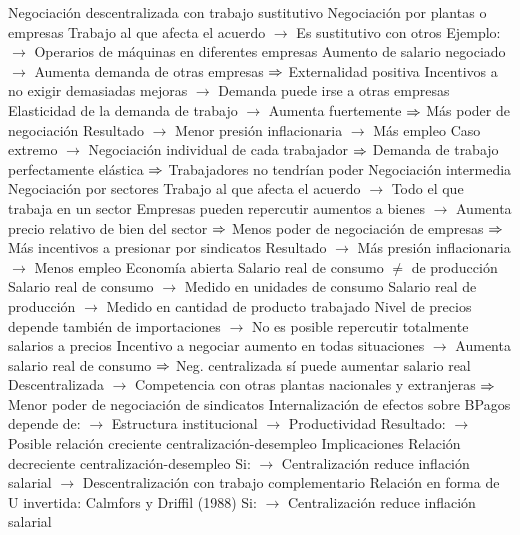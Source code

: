 \documentclass{nuevotema}
\begin{document}
\begin{esquemal}
				\4 Negociación descentralizada con trabajo sustitutivo
				\4[] Negociación por plantas o empresas
				\4[] Trabajo al que afecta el acuerdo
				\4[] $\to$ Es sustitutivo con otros
				\4[] Ejemplo:
				\4[] $\to$ Operarios de máquinas en diferentes empresas
				\4[] Aumento de salario negociado
				\4[] $\to$ Aumenta demanda de otras empresas
				\4[] $\Rightarrow$ Externalidad positiva
				\4[] Incentivos a no exigir demasiadas mejoras
				\4[] $\to$ Demanda puede irse a otras empresas
				\4[] Elasticidad de la demanda de trabajo
				\4[] $\to$ Aumenta fuertemente
				\4[] $\Rightarrow$ Más poder de negociación
				\4[] Resultado
				\4[] $\to$ Menor presión inflacionaria
				\4[] $\to$ Más empleo
				\4[] Caso extremo
				\4[] $\to$ Negociación individual de cada trabajador
				\4[] $\Rightarrow$ Demanda de trabajo perfectamente elástica
				\4[] $\Rightarrow$ Trabajadores no tendrían poder
				\4 Negociación intermedia
				\4[] Negociación por sectores
				\4[] Trabajo al que afecta el acuerdo
				\4[] $\to$ Todo el que trabaja en un sector
				\4[] Empresas pueden repercutir aumentos a bienes
				\4[] $\to$ Aumenta precio relativo de bien del sector
				\4[] $\Rightarrow$ Menos poder de negociación de empresas
				\4[] $\Rightarrow$ Más incentivos a presionar por sindicatos
				\4[] Resultado
				\4[] $\to$ Más presión inflacionaria
				\4[] $\to$ Menos empleo
				\4 Economía abierta
				\4[] Salario real de consumo $\neq$ de producción
				\4[] Salario real de consumo
				\4[] $\to$ Medido en unidades de consumo
				\4[] Salario real de producción
				\4[] $\to$ Medido en cantidad de producto trabajado
				\4[] Nivel de precios depende también de importaciones
				\4[] $\to$ No es posible repercutir totalmente salarios a precios
				\4[] Incentivo a negociar aumento en todas situaciones
				\4[] $\to$ Aumenta salario real de consumo
				\4[] $\Rightarrow$ Neg. centralizada sí puede aumentar salario real
				\4[] Descentralizada
				\4[] $\to$ Competencia con otras plantas nacionales y extranjeras
				\4[] $\Rightarrow$ Menor poder de negociación de sindicatos
				\4[] Internalización de efectos sobre BPagos depende de:
				\4[] $\to$ Estructura institucional
				\4[] $\to$ Productividad
				\4[] Resultado:
				\4[] $\to$ Posible relación creciente centralización-desempleo
			\3 Implicaciones
				\4 Relación decreciente centralización-desempleo
				\4[] Si:
				\4[] $\to$ Centralización reduce inflación salarial
				\4[] $\to$ Descentralización con trabajo complementario
				\4 Relación en forma de U invertida: Calmfors y Driffil (1988)
				\4[] Si:
				\4[] $\to$ Centralización reduce inflación salarial

\end{esquemal}
\end{document}
